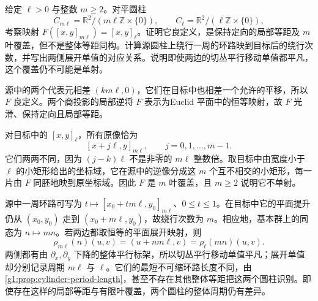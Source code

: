 \begin{exercise}\label{g1:ex:cylinder-local-isometry-covering}
	给定 \(\ell>0\) 与整数 \(m\ge2\)。对平圆柱
	\[
		C_{m\ell}=\mathbb R^2/(m\ell\mathbb Z\times\{0\}),\qquad
		C_\ell=\mathbb R^2/(\ell\mathbb Z\times\{0\}),
	\]
	考察映射 \(F([x,y]_{m\ell})=[x,y]_\ell\)。证明它良定义，是保持定向的局部等距及 \(m\) 叶覆盖，但不是整体等距同构。计算源圆柱上绕行一周的环路映到目标后的绕行次数，并写出两侧展开单值的对应关系。说明即使两边的切丛平行移动单值都平凡，这个覆盖仍不可能是单射。
\end{exercise}
\begin{solution}
	源中的两个代表元相差 \((km\ell,0)\)，它们在目标中也相差一个允许的平移，所以 \(F\) 良定义。两个商投影的局部逆将 \(F\) 表示为Euclid 平面中的恒等映射，故 \(F\) 光滑、保持定向且局部等距。

	对目标中的 \([x,y]_\ell\)，所有原像恰为
	\[
		[x+j\ell,y]_{m\ell},\qquad j=0,1,\ldots,m-1.
	\]
	它们两两不同，因为 \((j-k)\ell\) 不是非零的 \(m\ell\) 整数倍。取目标中由宽度小于 \(\ell\) 的小矩形给出的坐标域，它在源中的逆像分成这 \(m\) 个互不相交的小矩形，每一片由 \(F\) 同胚地映到原坐标域。因此 \(F\) 是 \(m\) 叶覆盖，且 \(m\ge2\) 说明它不单射。

	源中一周环路可写为 \(t\mapsto[x_0+tm\ell,y_0]_{m\ell}\)、\(0\le t\le1\)。在目标中它的平面提升仍从 \((x_0,y_0)\) 走到 \((x_0+m\ell,y_0)\)，故绕行次数为 \(m\)。相应地，基本群上的同态为 \(n\mapsto mn\)。若两边都取恒等的平面展开映射，则
	\[
		\rho_{m\ell}(n)(u,v)=(u+nm\ell,v)
		=\rho_\ell(mn)(u,v).
	\]
	两侧都有由 \(\partial_x,\partial_y\) 下降的整体平行标架，所以切丛平行移动单值平凡；展开单值却分别记录周期 \(m\ell\) 与 \(\ell\)。它们的最短不可缩环路长度不同，由\cref{g1:prop:cylinder-period-length}，甚至不存在其他整体等距把这两个圆柱识别。即使存在这样的局部等距与有限叶覆盖，两个圆柱的整体周期仍有差异。
\end{solution}

